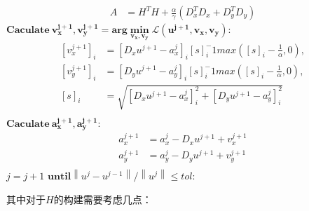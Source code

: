\documentclass[UTF8]{ctexart}
\begin{document}
\begin{sloppypar}
\begin{algorithm}
\begin{algorithmic}
\begin{equation}
\begin{aligned}
                        A       &= H^{T}H+\frac{\alpha}{\gamma}\left( D^T_xD_x + D^T_yD_y \right)
                    \end{aligned}
                \end{equation}
                \STATE $\bm{Caculate \ {v_x^{j+1}, v_y^{j+1}} = arg \min\limits_{v_x,v_y} \mathcal{L}(u^{j+1},v_x,v_y) }$:
                \begin{equation}
                    \begin{aligned}
                        [v_x^{j+1}]_i &=\left[ D_xu^{j+1}-a^j_x \right]_i[s]_i^-1max([s]_i-\frac{1}{\alpha},0), \\
                        [v_y^{j+1}]_i &=\left[ D_yu^{j+1}-a^j_y \right]_i[s]_i^-1max([s]_i-\frac{1}{\alpha},0), \\
                        [s]_i &= \sqrt {\left[ D_x u^{j+1} - a_x^{j} \right]_i^2 +\left[ D_y u^{j+1} - a_y^{j} \right]_i^2 }\\
                    \end{aligned}
                \end{equation}
                \STATE $\bm{Caculate \ {a_x^{j+1}, a_y^{j+1}} }$:
                \begin{equation}
                    \begin{aligned}
                        a_x^{j+1} &= a_x^{j} - D_xu^{j+1} + v_x^{j+1}\\
                        a_y^{j+1} &= a_y^{j} - D_yu^{j+1} + v_y^{j+1}\\
                    \end{aligned}
                \end{equation}
                \STATE $j = j+1$
                \STATE $\bm{until} \left\| u^{j} - u^{j-1} \right\|/\left\| u^{j} \right\| \leq tol$:
            \end{algorithmic}
            \label{alg:ALM_Ustep}
        \end{algorithm}
        其中对于$H$的构建需要考虑几点：


\end{sloppypar}
\end{document}
